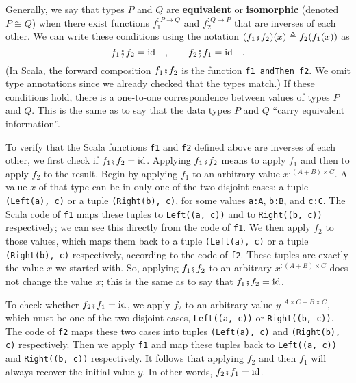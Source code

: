 Generally, we say that types $P$ and $Q$ are \textbf{equivalent}
or \textbf{isomorphic} (denoted $P\cong Q$) when
there exist functions $f_{1}^{:P\rightarrow Q}$ and $f_{2}^{:Q\rightarrow P}$
that are inverses of each other. We can write these conditions using
the notation $(f_{1}\bef f_{2})(x)\triangleq f_{2}(f_{1}(x))$ as
\[
f_{1}\bef f_{2}=\text{id}\quad,\quad\quad f_{2}\bef f_{1}=\text{id}\quad.
\]
(In Scala, the forward composition $f_{1}\bef f_{2}$ is the function
\lstinline!f1 andThen f2!. We omit type annotations since we already
checked that the types match.) If these conditions hold, there is
a one-to-one correspondence between values of types $P$ and $Q$.
This is the same as to say that the data types $P$ and $Q$ \textsf{``}carry
equivalent information\textsf{''}.

To verify that the Scala functions \lstinline!f1! and \lstinline!f2!
defined above are inverses of each other, we first check if $f_{1}\bef f_{2}=\text{id}$.
Applying $f_{1}\bef f_{2}$ means to apply $f_{1}$ and then to apply
$f_{2}$ to the result. Begin by applying $f_{1}$ to an arbitrary
value $x^{:(A+B)\times C}$. A value $x$ of that type can be in only
one of the two disjoint cases: a tuple \lstinline!(Left(a), c)! or
a tuple \lstinline!(Right(b), c)!, for some values \lstinline!a:A!,
\lstinline!b:B!, and \lstinline!c:C!. The Scala code of \lstinline!f1!
maps these tuples to \lstinline!Left((a, c))! and to \lstinline!Right((b, c))!
respectively; we can see this directly from the code of \lstinline!f1!.
We then apply $f_{2}$ to those values, which maps them back to a
tuple \lstinline!(Left(a), c)! or a tuple \lstinline!(Right(b), c)!
respectively, according to the code of \lstinline!f2!. These tuples
are exactly the value $x$ we started with. So, applying $f_{1}\bef f_{2}$
to an arbitrary $x^{:(A+B)\times C}$ does not change the value $x$;
this is the same as to say that $f_{1}\bef f_{2}=\text{id}$.

To check whether $f_{2}\bef f_{1}=\text{id}$, we apply $f_{2}$ to
an arbitrary value $y^{:A\times C+B\times C}$, which must be one
of the two disjoint cases, \lstinline!Left((a, c))! or \lstinline!Right((b, c))!.
The code of \lstinline!f2! maps these two cases into tuples \lstinline!(Left(a), c)!
and \lstinline!(Right(b), c)! respectively. Then we apply \lstinline!f1!
and map these tuples back to \lstinline!Left((a, c))! and \lstinline!Right((b, c))!
respectively. It follows that applying $f_{2}$ and then $f_{1}$
will always recover the initial value $y$. In other words, $f_{2}\bef f_{1}=\text{id}$.

